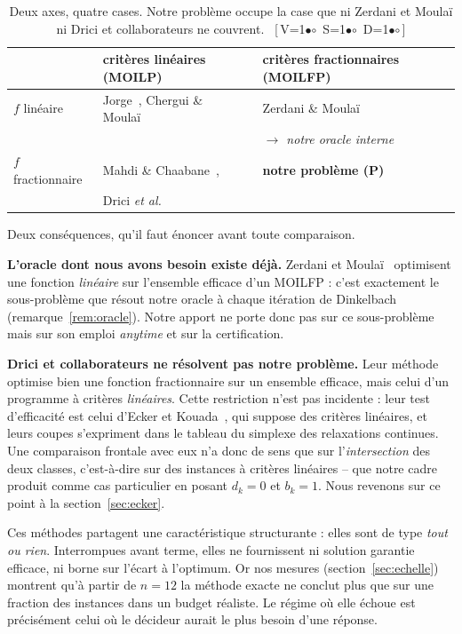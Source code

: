 \documentclass[11pt,a4paper]{article}
\theoremstyle{plain}
\theoremstyle{remark}
\newcommand{\cfgm}[1]{\ifnum#1=1$\bullet$\else$\circ$\fi}
\newcommand{\conf}[3]{%
  \textsf{\footnotesize[\,V\cfgm{#1}\ S\cfgm{#2}\ D\cfgm{#3}\,]}}
\begin{document}
\begin{table}[H]
\centering
\caption{Deux axes, quatre cases. Notre problème occupe la case que ni
Zerdani et Moulaï ni Drici et collaborateurs ne couvrent.\ \conf{0}{0}{0}}
\label{tab:position}
\begin{tabular}{lll}
\toprule
& critères \textbf{linéaires} (MOILP) & critères \textbf{fractionnaires} (MOILFP)\\
\midrule
$f$ linéaire
 & Jorge~\cite{jorge2009}, Chergui \& Moulaï~\cite{chergui2008}
 & Zerdani \& Moulaï~\cite{zerdani2011}\\
 & & \emph{$\to$ notre oracle interne}\\[3pt]
$f$ fractionnaire
 & Mahdi \& Chaabane~\cite{mahdi2015},
 & \textbf{notre problème (P)}\\
 & Drici \emph{et al.}~\cite{drici2018} & \\
\bottomrule
\end{tabular}
\end{table}

\noindent
Deux conséquences, qu'il faut énoncer avant toute comparaison.

\textbf{L'oracle dont nous avons besoin existe déjà.} Zerdani et
Moulaï~\cite{zerdani2011} optimisent une fonction \emph{linéaire} sur
l'ensemble efficace d'un MOILFP : c'est exactement le sous-problème que
résout notre oracle à chaque itération de Dinkelbach
(remarque~\ref{rem:oracle}). Notre apport ne porte donc pas sur ce
sous-problème mais sur son emploi \emph{anytime} et sur la certification.

\textbf{Drici et collaborateurs ne résolvent pas notre problème.} Leur
méthode~\cite{drici2018} optimise bien une fonction fractionnaire sur un
ensemble efficace, mais celui d'un programme à critères \emph{linéaires}.
Cette restriction n'est pas incidente : leur test d'efficacité est celui
d'Ecker et Kouada~\cite{ecker1975}, qui suppose des critères linéaires, et
leurs coupes s'expriment dans le tableau du simplexe des relaxations
continues. Une comparaison frontale avec eux n'a donc de sens que sur
l'\emph{intersection} des deux classes, c'est-à-dire sur des instances à
critères linéaires -- que notre cadre produit comme cas particulier en posant
$d_k=0$ et $b_k=1$. Nous revenons sur ce point à la
section~\ref{sec:ecker}.

Ces méthodes partagent une caractéristique structurante : elles sont de type
\emph{tout ou rien}. Interrompues avant terme, elles ne fournissent ni
solution garantie efficace, ni borne sur l'écart à l'optimum. Or nos mesures
(section~\ref{sec:echelle}) montrent qu'à partir de $n=12$ la méthode exacte
ne conclut plus que sur une fraction des instances dans un budget réaliste.
Le régime où elle échoue est précisément celui où le décideur aurait le plus
besoin d'une réponse.
\end{document}
